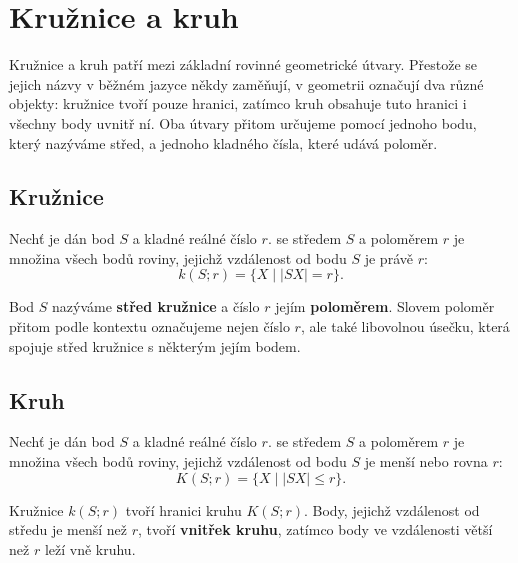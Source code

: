 \documentclass[12pt,a4paper]{article}
\begin{document}

\section{Kružnice a kruh}

Kružnice a kruh patří mezi základní rovinné geometrické útvary. Přestože se jejich názvy v běžném jazyce někdy zaměňují,
v geometrii označují dva různé objekty: kružnice tvoří pouze hranici, zatímco kruh obsahuje tuto hranici i všechny body
uvnitř ní. Oba útvary přitom určujeme pomocí jednoho bodu, který nazýváme střed, a jednoho kladného čísla, které udává poloměr.

\subsection{Kružnice}

\begin{definitionbox}
    Nechť je dán bod $S$ a kladné reálné číslo $r$.  se středem $S$ a poloměrem $r$ je množina
    všech bodů roviny, jejichž vzdálenost od bodu $S$ je právě $r$:
    \[
        k(S;r)=\{X\mid |SX|=r\}.
    \]
\end{definitionbox}

Bod $S$ nazýváme \textbf{střed kružnice} a číslo $r$ jejím \textbf{poloměrem}. Slovem poloměr přitom podle kontextu
označujeme nejen číslo $r$, ale také libovolnou úsečku, která spojuje střed kružnice s některým jejím bodem.

\subsection{Kruh}

\begin{definitionbox}
    Nechť je dán bod $S$ a kladné reálné číslo $r$.  se středem $S$ a poloměrem $r$ je množina
    všech bodů roviny, jejichž vzdálenost od bodu $S$ je menší nebo rovna $r$:
    \[
        K(S;r)=\{X\mid |SX|\leq r\}.
    \]
\end{definitionbox}

Kružnice $k(S;r)$ tvoří hranici kruhu $K(S;r)$. Body, jejichž vzdálenost od středu je menší než $r$, tvoří
\textbf{vnitřek kruhu}, zatímco body ve vzdálenosti větší než $r$ leží vně kruhu.
\end{document}
